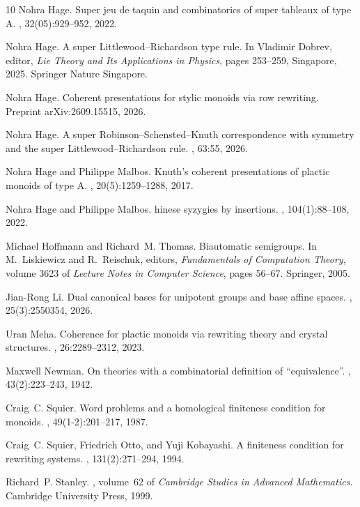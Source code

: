 \documentclass[a4paper, twoside, 11pt, english]{article}
\theoremstyle{plain}
\theoremstyle{definition}
\begin{document}
\begin{small}
\begin{thebibliography}{10}
Nohra Hage.
\newblock Super jeu de taquin and combinatorics of super tableaux of type {A}.
,
  32(05):929--952, 2022.

Nohra Hage.
\newblock A super {L}ittlewood--{R}ichardson type rule.
\newblock In Vladimir Dobrev, editor, {\em Lie Theory and Its Applications in
  Physics}, pages 253--259, Singapore, 2025. Springer Nature Singapore.

Nohra Hage.
\newblock Coherent presentations for stylic monoids via row rewriting.
\newblock Preprint arXiv:2609.15515, 2026.

Nohra Hage.
\newblock A super {R}obinson--{S}chensted--{K}nuth correspondence with symmetry
  and the super {L}ittlewood--{R}ichardson rule.
, 63:55, 2026.

Nohra Hage and Philippe Malbos.
\newblock Knuth's coherent presentations of plactic monoids of type {A}.
, 20(5):1259--1288, 2017.

Nohra Hage and Philippe Malbos.
hinese syzygies by insertions.
, 104(1):88--108, 2022.

Michael Hoffmann and Richard~M. Thomas.
\newblock Biautomatic semigroups.
\newblock In M.~Liskiewicz and R.~Reischuk, editors, {\em Fundamentals of
  Computation Theory}, volume 3623 of {\em Lecture Notes in Computer Science},
  pages 56--67. Springer, 2005.

Jian-Rong Li.
\newblock Dual canonical bases for unipotent groups and base affine spaces.
, 25(3):2550354, 2026.

Uran Meha.
\newblock Coherence for plactic monoids via rewriting theory and crystal
  structures.
, 26:2289--2312, 2023.

Maxwell Newman.
\newblock On theories with a combinatorial definition of ``equivalence''.
, 43(2):223--243, 1942.

Craig~C. Squier.
\newblock Word problems and a homological finiteness condition for monoids.
, 49(1-2):201--217, 1987.

Craig~C. Squier, Friedrich Otto, and Yuji Kobayashi.
\newblock A finiteness condition for rewriting systems.
, 131(2):271--294, 1994.

Richard~P. Stanley.
, volume~62 of {\em
  Cambridge Studies in Advanced Mathematics}.
\newblock Cambridge University Press, 1999.

\end{thebibliography}

\end{small}
\end{document}
